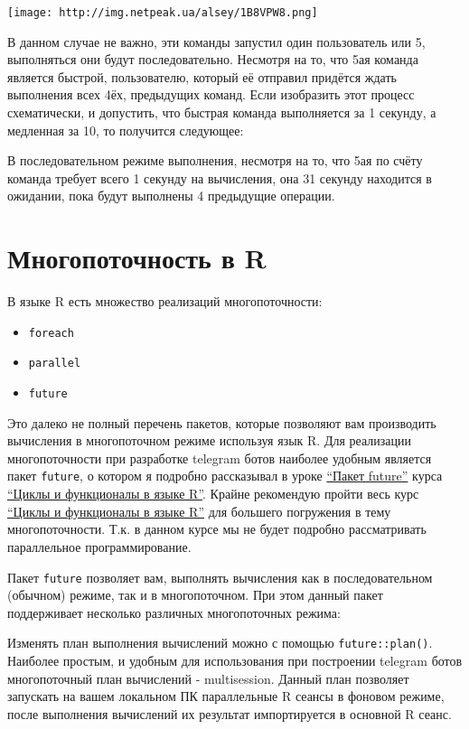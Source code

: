 \documentclass[
]{book}
\providecommand{\tightlist}{%
  \setlength{\itemsep}{0pt}\setlength{\parskip}{0pt}}
\begin{document}
\texttt{[image: http://img.netpeak.ua/alsey/1B8VPW8.png]}

В данном случае не важно, эти команды запустил один пользователь или 5, выполняться они будут последовательно. Несмотря на то, что 5ая команда является быстрой, пользователю, который её отправил придётся ждать выполнения всех 4ёх, предыдущих команд. Если изобразить этот процесс схематически, и допустить, что быстрая команда выполняется за 1 секунду, а медленная за 10, то получится следующее:

В последовательном режиме выполнения, несмотря на то, что 5ая по счёту команда требует всего 1 секунду на вычисления, она 31 секунду находится в ожидании, пока будут выполнены 4 предыдущие операции.

\section{Многопоточность в R}\label{ux43cux43dux43eux433ux43eux43fux43eux442ux43eux447ux43dux43eux441ux442ux44c-ux432-r}

В языке R есть множество реализаций многопоточности:

\begin{itemize}
\tightlist
\item
  \texttt{foreach}
\item
  \texttt{parallel}
\item
  \texttt{future}
\end{itemize}

Это далеко не полный перечень пакетов, которые позволяют вам производить вычисления в многопоточном режиме используя язык R. Для реализации многопоточности при разработке telegram ботов наиболее удобным является пакет \texttt{future}, о котором я подробно рассказывал в уроке \href{https://selesnow.github.io/iterations_in_r/\%D0\%BF\%D0\%B0\%D0\%BA\%D0\%B5\%D1\%82-future.html}{``Пакет future''} курса \href{https://selesnow.github.io/iterations_in_r/}{``Циклы и функционалы в языке R''}. Крайне рекомендую пройти весь курс \href{https://selesnow.github.io/iterations_in_r/}{``Циклы и функционалы в языке R''} для большего погружения в тему многопоточности. Т.к. в данном курсе мы не будет подробно рассматривать параллельное программирование.

Пакет \texttt{future} позволяет вам, выполнять вычисления как в последовательном (обычном) режиме, так и в многопоточном. При этом данный пакет поддерживает несколько различных многопоточных режима:

Изменять план выполнения вычислений можно с помощью \texttt{future::plan()}. Наиболее простым, и удобным для использования при построении telegram ботов многопоточный план вычислений - multisession. Данный план позволяет запускать на вашем локальном ПК параллельные R сеансы в фоновом режиме, после выполнения вычислений их результат импортируется в основной R сеанс.
\end{document}
